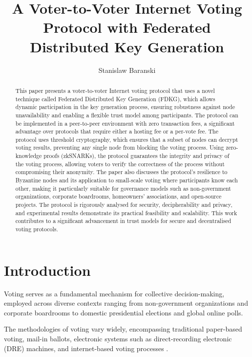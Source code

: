 \documentclass[runningheads]{llncs}
\title{A Voter-to-Voter Internet Voting Protocol with Federated Distributed Key Generation}
\author{Stanislaw Baranski\inst{1}}
\institute{Gdansk University of Technology, Narutowicza 11/12 80-233, Gdansk, Poland \email{stanislaw.baranski@pg.edu.pl}}
\begin{document}
\maketitle


\begin{abstract}
This paper presents a voter-to-voter Internet voting protocol that uses a novel technique called Federated Distributed Key Generation (FDKG), which allows dynamic participation in the key generation process, ensuring robustness against node unavailability and enabling a flexible trust model among participants. The protocol can be implemented in a peer-to-peer environment with zero transaction fees, a significant advantage over protocols that require either a hosting fee or a per-vote fee. The protocol uses threshold cryptography, which ensures that a subset of nodes can decrypt voting results, preventing any single node from blocking the voting process. Using zero-knowledge proofs (zkSNARKs), the protocol guarantees the integrity and privacy of the voting process, allowing voters to verify the correctness of the process without compromising their anonymity. The paper also discusses the protocol's resilience to Byzantine nodes and its application to small-scale voting where participants know each other, making it particularly suitable for governance models such as non-government organizations, corporate boardrooms, homeowners' associations, and open-source projects. The protocol is rigorously analysed for security, decipherability and privacy, and experimental results demonstrate its practical feasibility and scalability. This work contributes to a significant advancement in trust models for secure and decentralised voting protocols.
\end{abstract}


\section{Introduction}

Voting serves as a fundamental mechanism for collective decision-making, employed across diverse contexts ranging from non-government organizations and corporate boardrooms to domestic presidential elections and global online polls.

The methodologies of voting vary widely, encompassing traditional paper-based voting, mail-in ballots, electronic systems such as direct-recording electronic (DRE) machines, and internet-based voting processes \cite{parkGoingBadWorse2021}.
\end{document}
